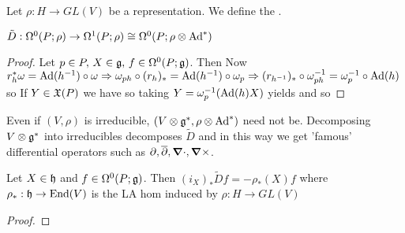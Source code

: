 \documentclass{article}
\begin{document}
\begin{definition}
Let $\rho: H \to GL(V)$ be a representation. We define 
the . 
\end{definition}

\begin{prop}
$\tilde{D} : \Omega^0(P;\rho) \to \Omega^1(P;\rho) \cong \Omega^0(P;\rho \otimes \operatorname{Ad}^\ast)$
\end{prop}
\begin{proof}
Let $p \in P, \, X \in \mathfrak{g}, \, f \in \Omega^0(P;\mathfrak{g})$. Then 
Now $r_h^\ast \omega= \operatorname{Ad}(h^{-1}) \circ \omega \Rightarrow \omega_{ph} \circ (r_h)_\ast = \operatorname{Ad}(h^{-1}) \circ \omega_p \Rightarrow (r_{h^{-1}})_\ast \circ \omega_{ph}^{-1} = \omega_p^{-1} \circ \operatorname{Ad}(h)$ so
If $Y \in \mathfrak{X}(P)$ we have 
so taking $Y = \omega_p^{-1} (\operatorname{Ad}(h)X)$ yields 
and so 
\end{proof}
Even if $(V,\rho)$ is irreducible, $(V \otimes \mathfrak{g}^\ast, \rho \otimes \operatorname{Ad}^\ast)$ need not be. Decomposing $V \otimes \mathfrak{g}^\ast$ into irreducibles decomposes $\tilde{D}$ and in this way we get 'famous' differential operators such as $\partial,\overline{\partial}, \bm{\nabla}\cdot, \bm{\nabla}\times$.

\begin{lemma}
Let $X \in \mathfrak{h} $ and $f \in \Omega^0(P;\mathfrak{g})$. Then $(i_X)_\ast \tilde{D}f = -\rho_\ast(X) f$ where $\rho_\ast : \mathfrak{h} \to \operatorname{End}(V)$ is the LA hom induced by $\rho : H \to GL(V)$
 \end{lemma}
\begin{proof}
\end{proof}
\end{document}
